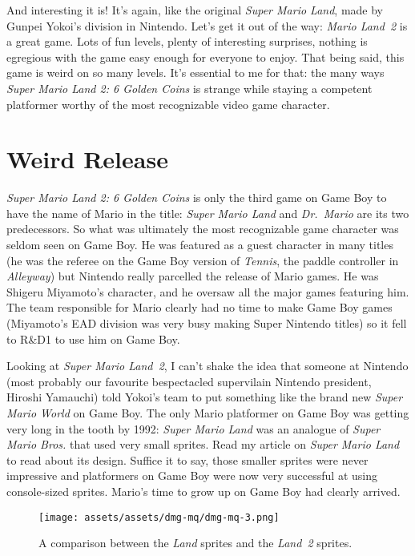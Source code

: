 \documentclass{book}
\begin{document}
And interesting it is! It’s again, like the original \emph{Super Mario Land}, made by Gunpei Yokoi’s division in Nintendo. Let’s get it out of the way: \emph{Mario Land 2} is a great game. Lots of fun levels, plenty of interesting surprises, nothing is egregious with the game easy enough for everyone to enjoy. That being said, this game is weird on so many levels. It’s essential to me for that: the many ways \emph{Super Mario Land 2: 6 Golden Coins} is strange while staying a competent platformer worthy of the most recognizable video game character.

\FloatBarrier\needspace{10mm}\section*{Weird Release}\nopagebreak[4]

\emph{Super Mario Land 2: 6 Golden Coins} is only the third game on Game Boy to have the name of Mario in the title: \emph{Super Mario Land} and \emph{Dr. Mario} are its two predecessors. So what was ultimately the most recognizable game character was seldom seen on Game Boy. He was featured as a guest character in many titles (he was the referee on the Game Boy version of \emph{Tennis}, the paddle controller in \emph{Alleyway}) but Nintendo really parcelled the release of Mario games. He was Shigeru Miyamoto’s character, and he oversaw all the major games featuring him. The team responsible for Mario clearly had no time to make Game Boy games (Miyamoto’s EAD division was very busy making Super Nintendo titles) so it fell to R\&D1 to use him on Game Boy.

Looking at \emph{Super Mario Land 2}, I can’t shake the idea that someone at Nintendo (most probably our favourite bespectacled supervilain Nintendo president, Hiroshi Yamauchi) told Yokoi’s team to put something like the brand new \emph{Super Mario World} on Game Boy. The only Mario platformer on Game Boy was getting very long in the tooth by 1992: \emph{Super Mario Land} was an analogue of \emph{Super Mario Bros.} that used very small sprites. Read my article on \emph{Super Mario Land} to read about its design. Suffice it to say, those smaller sprites were never impressive and platformers on Game Boy were now very successful at using console-sized sprites. Mario’s time to grow up on Game Boy had clearly arrived.

\begin{figure}[hbt]
\vskip 10pt
\centering \texttt{[image: assets/assets/dmg-mq/dmg-mq-3.png]}\par\pagetwodescription A comparison between the \emph{Land} sprites and the \emph{Land 2} sprites.
\vskip 6pt
\end{figure}
\end{document}
